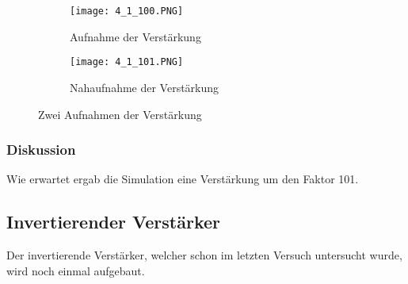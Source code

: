 \documentclass[12pt,a4paper]{article}
\begin{document}
\begin{figure}[H]
        \centering
        \begin{subfigure}[b]{0.48\textwidth}
               \texttt{[image: 4\_1\_100.PNG]}
				\caption[Aufnahme der Verstärkung]{Aufnahme der Verstärkung\footnotemark}
 				 \label{fig:4_1_100}
        \end{subfigure}%
        \hfill
        \begin{subfigure}[b]{0.48\textwidth}
                \texttt{[image: 4\_1\_101.PNG]}
  				\caption[Nahaufnahme der Verstärkung]{Nahaufnahme der Verstärkung\footnotemark}
  				\label{fig:4_1_101}
        \end{subfigure}
        \caption{Zwei Aufnahmen der Verstärkung}
        \label{fig:4_1}
\end{figure}

\subsubsection{Diskussion}

Wie erwartet ergab die Simulation eine Verstärkung um den Faktor 101.





\subsection{Invertierender Verstärker}
Der invertierende Verstärker, welcher schon im letzten Versuch untersucht wurde, wird noch einmal aufgebaut.
\end{document}
